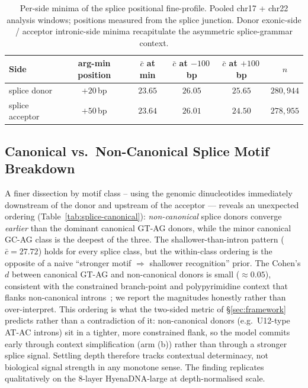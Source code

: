\documentclass{article}
\theoremstyle{plain}
\theoremstyle{definition}
\theoremstyle{remark}
\begin{document}
\begin{table}[!htbp]
  \caption{Per-side minima of the splice positional fine-profile.
    Pooled chr17 + chr22 analysis windows; positions measured from the
    splice junction. Donor exonic-side / acceptor intronic-side minima
  recapitulate the asymmetric splice-grammar context.}
  \label{tab:splice-fine}
  \centering
  \small
  \begin{tabular}{@{}lccccc@{}}
    \toprule
    Side & arg-min position & $\bar c$ at min & $\bar c$ at $-100$\,bp
    & $\bar c$ at $+100$\,bp & $n$ \\
    \midrule
    splice donor    & $+20$\,bp & $23.65$ & $26.05$ & $25.65$ & $280{,}944$ \\
    splice acceptor & $+50$\,bp & $23.64$ & $26.01$ & $24.50$ & $278{,}955$ \\
    \bottomrule
  \end{tabular}
\end{table}

\subsection{Canonical vs.\ Non-Canonical Splice Motif Breakdown}
\label{app:splice-canonical}

A finer dissection by motif class -- using the genomic dinucleotides
immediately downstream of the donor and upstream of the acceptor ---
reveals an unexpected ordering (Table~\ref{tab:splice-canonical}):
\emph{non-canonical} splice donors converge \emph{earlier} than the
dominant canonical GT-AG donors, while the minor canonical GC-AG class
is the deepest of the three. The shallower-than-intron pattern
($\bar c\!=\!27.72$) holds for every splice class, but the within-class
ordering is the opposite of a naive ``stronger motif $\Rightarrow$
shallower recognition'' prior. The Cohen's $d$ between canonical GT-AG
and non-canonical donors is small ($\approx 0.05$), consistent with the
constrained branch-point and polypyrimidine context that flanks
non-canonical introns~\cite{wang2008splicecode,burge1998u12}; we
report the magnitudes honestly rather than over-interpret.
This ordering
is what the two-sided metric of \S\ref{sec:framework} predicts rather than
a contradiction of it: non-canonical donors (e.g.\ U12-type AT-AC introns)
sit in a tighter, more constrained flank, so the model commits early
through context simplification (arm (b)) rather than through a stronger
splice signal. Settling depth therefore tracks contextual determinacy,
not biological signal strength in any monotone sense. The finding
replicates qualitatively on the 8-layer HyenaDNA-large at depth-normalised
scale.
\end{document}
